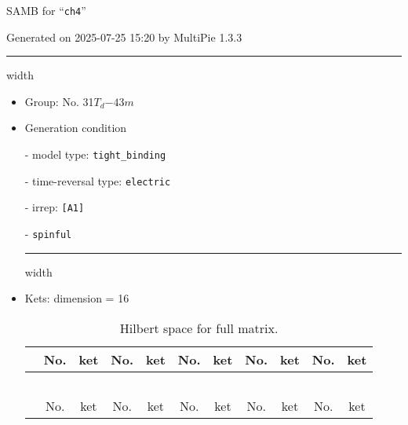 \documentclass[fleqn,10pt,landscape]{article}
\begin{document}
\setcounter{MaxMatrixCols}{32}

\setlength{\baselineskip}{16pt}
\footnotesize
\begin{center}
\LARGE
SAMB for ``\texttt{ch4}''
\end{center}
\begin{flushright}
Generated on 2025-07-25 15:20 by MultiPie 1.3.3
\end{flushright}
\vspace{1cm}


 \hfil \hrule height 1mm width \textwidth \hfil

\begin{itemize}
\item Group: No. 31\quad$T_{d}$\quad$-43m$\quad[ cubic ]

\vspace{5mm}

\item Generation condition

\quad - model type: \texttt{tight_binding}

\quad - time-reversal type: \texttt{electric}

\quad - irrep: \texttt{[A1]}

\quad - \texttt{spinful}


 \hfil \hrule height 1mm width \textwidth \hfil

\item Kets: dimension = 16
\begin{center}
\renewcommand{\arraystretch}{1.3}
\begin{longtable}{c|cc|cc|cc|cc|cc}
\caption{Hilbert space for full matrix.}
 \\
 \hline \hline
 & No. & ket & No. & ket & No. & ket & No. & ket & No. & ket \\ \hline \endfirsthead

\multicolumn{10}{l}{\tablename\ \thetable{}} \\
 \hline \hline
 & No. & ket & No. & ket & No. & ket & No. & ket & No. & ket \\ \hline \endhead


\end{longtable}
\end{center}
\end{itemize}
\end{document}
